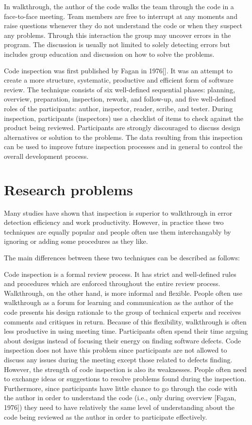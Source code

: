 In walkthrough, the author of the code walks the team through the
code in a face-to-face meeting. Team members are free to
interrupt at any moments and raise questions whenever they do not
understand the code or when they suspect any problems.  Through this
interaction  the group may uncover errors in the program.  
The discussion is usually not limited to solely
detecting errors but includes group education and
discussion on how to solve the problems.

Code inspection was first published by Fagan in 1976[].  It was
an attempt to create a more structure, systematic, 
productive and  efficient form of software review. The technique
 consists of six well-defined sequential phases: planning, overview, 
preparation,
inspection, rework, and follow-up, and five well-defined roles of
the participants: author, inspector, reader, scribe, and tester.
During inspection, participants (inspectors) use a checklist of
items to check against the product being reviewed.  Participants are
strongly discouraged to discuss design alternatives or solution
to the problems.  The data resulting from this inspection can
be used to improve future inspection processes and in general
to control the overall development process.


\section {Research problems}

Many studies have shown that inspection is  superior to
walkthrough in error detection efficiency and work productivity.  
However, in practice these
two techniques are equally popular and people often use them
interchangably by ignoring or adding some procedures as
they like.

The main differences between these two techniques can be
described as follows:

Code inspection is a formal review process. It has strict and 
well-defined rules and procedures which are enforced throughout the entire 
review process. Walkthrough, on the other hand, is more informal and 
flexible.  People often use walkthrough as a forum for learning
and communication as the author of the code presents his design
rationale to the group of technical experts and receives
comments and critiques in return.
Because of this flexibility, walkthrough is often less productive
in using meeting time. 
Participants often spend their time arguing about designs instead
of focusing their energy on finding software defects.  Code inspection
does not have this problem since participants are not allowed to discuss
any issues during the meeting except those related to defects finding.
However, the strength of code inspection is also its weaknesses.
People often need to exchange ideas or suggestions to resolve
problems found during the inspection. Furthermore, since participants
have little chance to go through the code with the author 
in order to understand the code (i.e., only during overview [Fagan, 1976])
they need to have relatively the same level of understanding about the code
being reviewed as the author in order to participate effectively.

